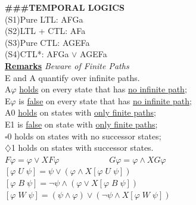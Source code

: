 \documentclass{article}
\begin{document}
\begin{multicols}{4}
\textbf{\#\#\#TEMPORAL LOGICS} \\
(S1)Pure LTL: AFGa \\
(S2)LTL + CTL: AFa \\
(S3)Pure CTL: AGEFa \\
(S4)CTL*: AFGa $\vee$ AGEFa \\
\textbf{\underline{Remarks}}
\textit{Beware of Finite Paths}\\
E and A quantify over infinite paths.\\
A$\varphi$ \underline{holds} on every state that has \underline{no infinite path};\\
E$\varphi$ is \underline{false} on every state that has \underline{no infinite path};\\
A0 \underline{holds} on states with \underline{only finite paths};\\
E1 is \underline{false} on state with \underline{only finite paths};\\
$\square$0 holds on states with no successor states;\\
$\diamondsuit$1 holds on states with successor states.\\
$F\varphi = \varphi \vee X F\varphi\qquad\qquad\qquad G\varphi = \varphi \wedge XG \varphi$\\
$[ \varphi \; U\; \psi ] = \psi \vee (\varphi\wedge X[ \varphi \; U\; \psi])$\\
$[ \varphi \; B\; \psi ] = \neg \psi \wedge (\varphi \vee X[ \varphi \; B\; \psi])$\\
$[ \varphi \; W\; \psi] = (\psi \wedge \varphi) \vee (\neg \psi \wedge X[\varphi \; W \; \psi])$


\end{multicols}
\end{document}
